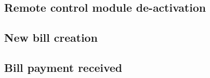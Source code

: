 \subsection{Remote control module de-activation}
\label{uc-remote-control-deactivation}


\subsection{New bill creation}
\label{uc-new-bill-creation}


\subsection{Bill payment received}
\label{uc-bill-payment-received}
